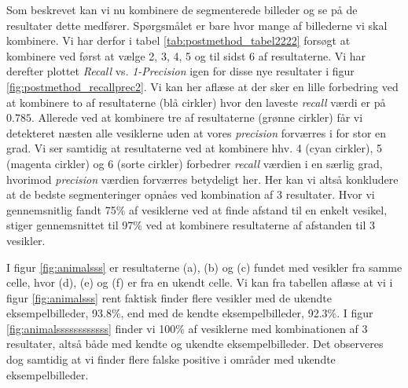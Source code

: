 Som beskrevet kan vi nu kombinere de segmenterede billeder og se på de resultater dette medfører. Spørgsmålet er bare hvor mange af billederne vi skal kombinere. Vi har derfor i tabel \ref{tab:postmethod_tabel2222} forsøgt at kombinere ved først at vælge 2, 3, 4, 5 og til sidst 6 af resultaterne. Vi har derefter plottet \emph{Recall} vs. \emph{1-Precision} igen for disse nye resultater i figur \ref{fig:postmethod_recallprec2}. Vi kan her aflæse at der sker en lille forbedring ved at kombinere to af resultaterne (blå cirkler) hvor den laveste \emph{recall} værdi er på $0.785$. Allerede ved at kombinere tre af resultaterne (grønne cirkler) får vi detekteret næsten alle vesiklerne uden at vores \emph{precision} forværres i for stor en grad. Vi ser samtidig at resultaterne ved at kombinere hhv. 4 (cyan cirkler), 5 (magenta cirkler) og 6 (sorte cirkler) forbedrer \emph{recall} værdien i en særlig grad, hvorimod \emph{precision} værdien forværres betydeligt her. Her kan vi altså konkludere at de bedste segmenteringer opnåes ved kombination af 3 resultater. Hvor vi gennemsnitlig fandt 75\% af vesiklerne ved at finde afstand til en enkelt vesikel, stiger gennemsnittet til 97\% ved at kombinere resultaterne af afstanden til 3 vesikler. 

I figur \ref{fig:animalsss} er resultaterne (a), (b) og (c) fundet med vesikler fra samme celle, hvor (d), (e) og (f) er fra en ukendt celle. Vi kan fra tabellen aflæse at vi i figur \ref{fig:animalsss} rent faktisk finder flere vesikler med de ukendte eksempelbilleder, 93.8\%, end med de kendte eksempelbilleder, 92.3\%. I figur \ref{fig:animalssssssssssss} finder vi 100\% af vesiklerne med kombinationen af 3 resultater, altså både med kendte og ukendte eksempelbilleder. Det observeres dog samtidig at vi finder flere falske positive i områder med ukendte eksempelbilleder. 

